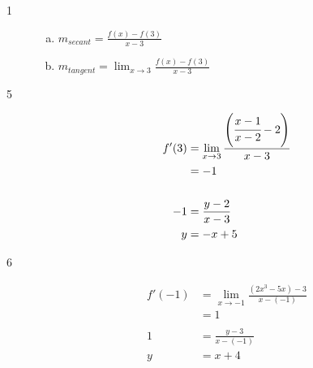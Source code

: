 \documentclass[letterpaper, landscape]{exam}
\begin{document}
    \begin{description}

      \item[1] 
        \begin{enumerate}[(a)]

          \item $m_{secant} = \frac{f(x) - f(3)}{x - 3}$ 

          \item $m_{tangent} = \lim_{x \to 3} \frac{f(x) - f(3)}{x - 3}$ 

        \end{enumerate}




      \item[5]

        \begin{align*}
          f'(3) & = \lim_{x \to 3} \frac{ \left( \cfrac{x - 1}{x - 2} - 2 \right) }{x - 3}
          \\    & = -1 \\
          \\
          -1    & = \frac{y - 2}{x - 3} \\
          y     & = -x + 5 \\
        \end{align*}
          

      \item[6]
        \begin{align*}
          f'(-1) & = \lim_{x \to -1} \frac{ \left(  2x^3 - 5x \right) - 3 }{x - (-1)} \\
                 & = 1 \\
          \\
          1      & = \frac{y - 3}{x - (-1)} \\
          y      & = x + 4 \\
        \end{align*}


\end{description}
\end{document}
